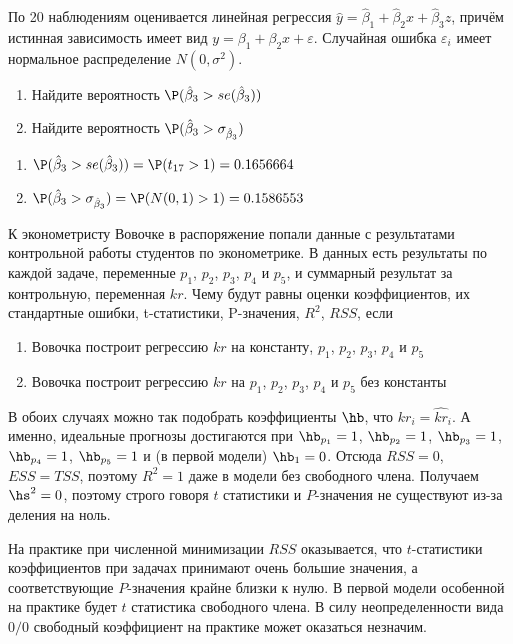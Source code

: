 \documentclass[pdftex,11pt,openany]{book}\usepackage[]{graphicx}\usepackage[]{color}
\begin{document}
\begin{problem}
 По 20 наблюдениям оценивается линейная регрессия $\hat{y}=\hat{\beta}_1 +\hat{\beta}_2 x+\hat{\beta}_3 z$, причём истинная зависимость имеет вид $y=\beta_1 +\beta_2 x+\varepsilon$. Случайная ошибка $\varepsilon_i$ имеет нормальное распределение $N(0,\sigma^2)$.

\begin{enumerate}
\item Найдите вероятность $\P(\hat{\beta}_3>se(\hat{\beta}_3))$
\item Найдите вероятность $\P(\hat{\beta}_3>\sigma_{\hat{\beta}_3})$
\end{enumerate}
\end{problem}
 
\begin{solution}

\begin{enumerate}
\item $\P(\hat{\beta}_3>se(\hat{\beta}_3))=\P(t_{17}>1)=0.1656664$
\item $\P(\hat{\beta}_3>\sigma_{\hat{\beta}_3})=\P(N(0,1)>1)=0.1586553$
\end{enumerate}
\end{solution}


\begin{problem}
 К эконометристу Вовочке в распоряжение попали данные с результатами контрольной работы студентов по эконометрике. В данных есть результаты по каждой задаче, переменные $p_1$, $p_2$, $p_3$, $p_4$ и $p_5$, и суммарный результат за контрольную, переменная $kr$. Чему будут равны оценки коэффициентов, их стандартные ошибки, t-статистики, P-значения, $R^2$, $RSS$, если
\begin{enumerate}
\item Вовочка построит регрессию $kr$ на константу, $p_1$, $p_2$, $p_3$, $p_4$ и $p_5$
\item Вовочка построит регрессию $kr$ на $p_1$, $p_2$, $p_3$, $p_4$ и $p_5$ без константы
\end{enumerate}
\end{problem}
 
\begin{solution}
В обоих случаях можно так подобрать коэффициенты $\hb$, что $kr_i=\widehat{kr}_i$. А именно, идеальные прогнозы достигаются при  $\hb_{p_1}=1$, $\hb_{p_2}=1$, $\hb_{p_3}=1$, $\hb_{p_4}=1$, $\hb_{p_5}=1$ и (в первой модели) $\hb_1=0$. Отсюда $RSS=0$, $ESS=TSS$, поэтому $R^2=1$ даже в модели без свободного члена. Получаем $\hs^2=0$, поэтому строго говоря $t$ статистики и $P$-значения не существуют из-за деления на ноль. 

На практике при численной минимизации $RSS$ оказывается, что $t$-статистики коэффициентов при задачах принимают очень большие значения, а соответствующие $P$-значения крайне близки к нулю. В первой модели особенной на практике будет $t$ статистика свободного члена. В силу неопределенности вида $0/0$ свободный коэффициент на практике может оказаться незначим.
\end{solution}
\end{document}
